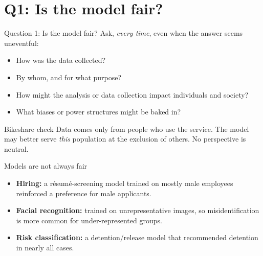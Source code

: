 \documentclass[aspectratio=43,11pt]{beamer}
\begin{document}
{
\section{Q1: Is the model fair?}

\begin{frame}{Question 1: Is the model fair?}
  Ask, \emph{every time}, even when the answer seems uneventful:
  \begin{itemize}
    \item How was the data collected?
    \item By whom, and for what purpose?
    \item How might the analysis or data collection impact individuals and society?
    \item What biases or power structures might be baked in?
  \end{itemize}
  \begin{alertblock}{Bikeshare check}
    Data comes only from people who use the service. The model may better serve \emph{this} population at the exclusion of others. No perspective is neutral.
  \end{alertblock}
\end{frame}

\begin{frame}{Models are not always fair}
  \begin{itemize}
    \item \textbf{Hiring:} a r\'esum\'e-screening model trained on mostly male employees reinforced a preference for male applicants.
    \item \textbf{Facial recognition:} trained on unrepresentative images, so misidentification is more common for under-represented groups.
    \item \textbf{Risk classification:} a detention/release model that recommended detention in nearly all cases.
  \end{itemize}
  \vspace{0.5em}
\end{frame}
}
\end{document}

